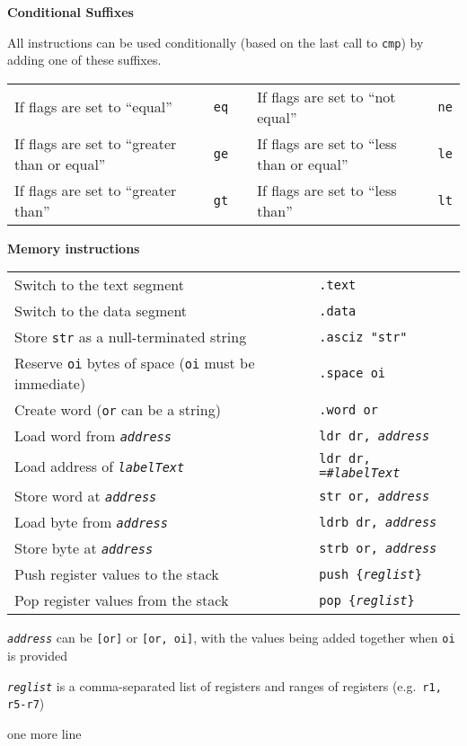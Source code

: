 \documentclass{article}
\begin{document}
\vspace{1em}
\noindent
\textbf{Conditional Suffixes}

All instructions can be used conditionally (based on the last call to
{\tt cmp}) by adding one of these suffixes.

\begin{tabular}{llrll}
If flags are set to ``equal'' & {\tt eq} & \hspace{1em} & If flags are set to ``not equal'' & {\tt ne} \\
If flags are set to ``greater than or equal'' & {\tt ge} & & If flags are set to ``less than or equal'' & {\tt le} \\
If flags are set to ``greater than'' & {\tt gt} & & If flags are set to ``less than'' & {\tt lt} \\
\end{tabular}

\vspace{1em}
\noindent
\textbf{Memory instructions}

\hspace*{2em}\begin{tabular}{ll}
Switch to the text segment & {\tt .text} \\
Switch to the data segment & {\tt .data} \\
Store {\tt str} as a null-terminated string & {\tt .asciz "str"} \\
Reserve {\tt oi} bytes of space ({\tt oi} must be immediate) \hspace{2em} & {\tt .space oi} \\
Create word ({\tt or} can be a string) & {\tt .word or} \\
Load word from {\tt \em address} & {\tt ldr dr, {\em address}} \\
Load address of {\tt \em labelText} & {\tt ldr dr, =\#{\em labelText}} \\
Store word at {\tt \em address} & {\tt str or, {\em address}} \\
Load byte from {\tt \em address} & {\tt ldrb dr, {\em address}} \\
Store byte at {\tt \em address} & {\tt strb or, {\em address}} \\
Push register values to the stack & {\tt push \{{\em reglist}\} } \\
Pop register values from the stack & {\tt pop \{{\em reglist}\}} \\
\end{tabular}

\vspace{0.5em}
{\tt\em address} can be {\tt [or]} or {\tt [or, oi]}, with the values
being added together when {\tt oi} is provided

{\tt\em reglist} is a comma-separated list of registers and ranges of
registers (e.g.\ {\tt r1, r5-r7})

one more line
\end{document}
